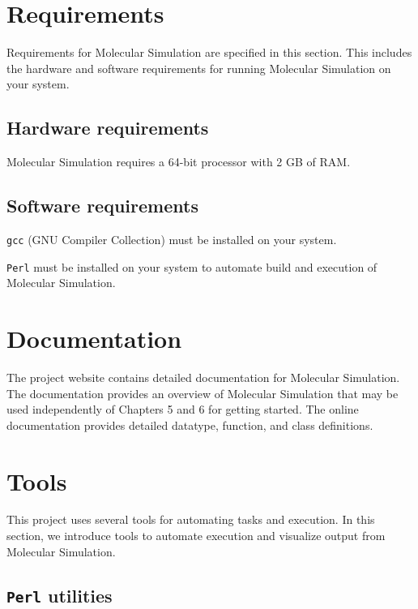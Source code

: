  	\section{Requirements}
 	
 	Requirements for Molecular Simulation are specified in this section.  This includes the hardware and software requirements for running Molecular Simulation on your system.

	\subsection{Hardware requirements}
	
	\par \noindent Molecular Simulation requires a 64-bit processor with 2 GB of RAM.  
 	
 	\subsection{Software requirements}
	
	\par \noindent \texttt{gcc} (GNU Compiler Collection) must be installed on your system. \\
	
	\par \noindent \texttt{Perl} must be installed on your system to automate build and execution of Molecular Simulation.
	

	\section{Documentation}

\noindent The project website contains detailed documentation for Molecular Simulation.  The documentation provides an overview of Molecular Simulation that may be used independently of Chapters 5 and 6 for getting started.  The online documentation provides detailed datatype, function, and class definitions.


	\section{Tools}
	
This project uses several tools for automating tasks and execution.  In this section, we introduce tools to automate execution and visualize output from Molecular Simulation.
		
		\subsection{\texttt{Perl} utilities}
		
